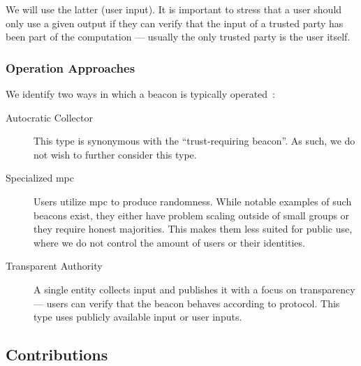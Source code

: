 We will use the latter (user input).
It is important to stress that a user should only use a given output if they can verify that the input of a trusted party has been part of the computation --- usually the only trusted party is the user itself.

\subsubsection{Operation Approaches}
We identify two ways in which a beacon is typically operated~:

\begin{description}
    \item[Autocratic Collector] This type is synonymous with the \enquote{trust-requiring beacon}. As such, we do not wish to further consider this type.

    \item [Specialized \acrshort{mpc}] Users utilize \acrfull{mpc} to produce randomness.
    While notable examples of such beacons exist, they either have problem scaling outside of small groups or they require honest majorities.
    This makes them less suited for public use, where we do not control the amount of users or their identities.

    \item [Transparent Authority] A single entity collects input and publishes it with a focus on transparency --- users can verify that the beacon behaves according to protocol.
    This type uses publicly available input or user inputs.

\end{description}


\subsection{Contributions}
